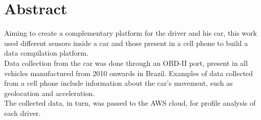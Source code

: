 \chapter*{Abstract}


\noindent Aiming to create a complementary platform for the driver and his car, this work used different sensors inside a car and those present in a cell phone to build a data compilation platform.\\
Data collection from the car was done through an OBD-II port, present in all vehicles manufactured from 2010 onwards in Brazil. Examples of data collected from a cell phone include information about the car's movement, such as geolocation and acceleration.\\
The collected data, in turn, was passed to the AWS cloud, for profile analysis of each driver.\\

